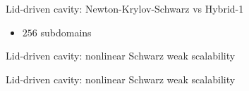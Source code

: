 \begin{frame}{Lid-driven cavity: Newton-Krylov-Schwarz vs Hybrid-1}
	\begin{itemize}
		\item $256$ subdomains
	\end{itemize}
	\begin{figure}
		\centering
		
		\label{fig:residual-ldc}
	\end{figure}
\end{frame}

\begin{frame}{Lid-driven cavity: nonlinear Schwarz weak scalability}
	\begin{figure}
		\centering
		
		\label{fig:weak-scalability-nls}
	\end{figure}
\end{frame}

\begin{frame}{Lid-driven cavity: nonlinear Schwarz weak scalability}
	\begin{figure}
		\centering
		
		\label{fig:weak-scalability-per-iter-nls}
	\end{figure}
\end{frame}

